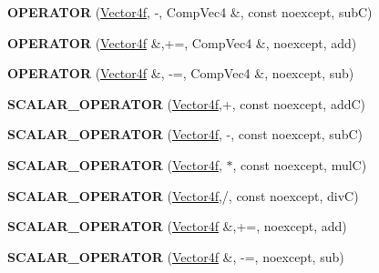 \begin{DoxyCompactItemize}
\item 
\mbox{\label{class_vector4f_ad67e7ea9ea0f3d63214331d9909e7a26}} 
{\bfseries O\+P\+E\+R\+A\+T\+OR} (\mbox{\hyperlink{class_vector4f}{Vector4f}}, -\/, Comp\+Vec4 \&, const noexcept, subC)
\item 
\mbox{\label{class_vector4f_aeeb51b5f24639a2e4b799c167258449b}} 
{\bfseries O\+P\+E\+R\+A\+T\+OR} (\mbox{\hyperlink{class_vector4f}{Vector4f}} \&,+=, Comp\+Vec4 \&, noexcept, add)
\item 
\mbox{\label{class_vector4f_acdf96c30b030fcbc2ddd5f731036141c}} 
{\bfseries O\+P\+E\+R\+A\+T\+OR} (\mbox{\hyperlink{class_vector4f}{Vector4f}} \&, -\/=, Comp\+Vec4 \&, noexcept, sub)
\item 
\mbox{\label{class_vector4f_a41af200090e6f6ddbbb25e1dbd6637ad}} 
{\bfseries S\+C\+A\+L\+A\+R\+\_\+\+O\+P\+E\+R\+A\+T\+OR} (\mbox{\hyperlink{class_vector4f}{Vector4f}},+, const noexcept, addC)
\item 
\mbox{\label{class_vector4f_afeada1d9fc08b68e0481305114d7a03b}} 
{\bfseries S\+C\+A\+L\+A\+R\+\_\+\+O\+P\+E\+R\+A\+T\+OR} (\mbox{\hyperlink{class_vector4f}{Vector4f}}, -\/, const noexcept, subC)
\item 
\mbox{\label{class_vector4f_acfe9f800513caea9c7859c9b5eb84dde}} 
{\bfseries S\+C\+A\+L\+A\+R\+\_\+\+O\+P\+E\+R\+A\+T\+OR} (\mbox{\hyperlink{class_vector4f}{Vector4f}}, $\ast$, const noexcept, mulC)
\item 
\mbox{\label{class_vector4f_a10f25f8c036554b6cf0878cf1a6d9f59}} 
{\bfseries S\+C\+A\+L\+A\+R\+\_\+\+O\+P\+E\+R\+A\+T\+OR} (\mbox{\hyperlink{class_vector4f}{Vector4f}},/, const noexcept, divC)
\item 
\mbox{\label{class_vector4f_a029f7ce38230c88ec6972da1d977ffe6}} 
{\bfseries S\+C\+A\+L\+A\+R\+\_\+\+O\+P\+E\+R\+A\+T\+OR} (\mbox{\hyperlink{class_vector4f}{Vector4f}} \&,+=, noexcept, add)
\item 
\mbox{\label{class_vector4f_a6acc48736b88c2702705963297e6548e}} 
{\bfseries S\+C\+A\+L\+A\+R\+\_\+\+O\+P\+E\+R\+A\+T\+OR} (\mbox{\hyperlink{class_vector4f}{Vector4f}} \&, -\/=, noexcept, sub)

\end{DoxyCompactItemize}
